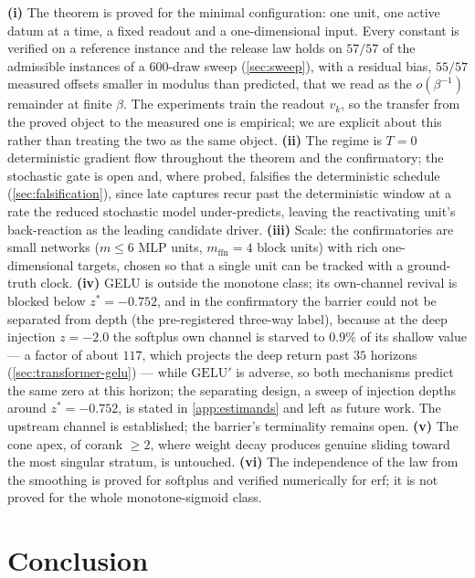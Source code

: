 \documentclass[11pt]{article}
\theoremstyle{definition}
\theoremstyle{remark}
\begin{document}
\textbf{(i)} The theorem is proved for the minimal configuration: one unit, one
active datum at a time, a fixed readout and a one-dimensional input. Every
constant is verified on a reference instance and the release law holds on
$57/57$ of the admissible instances of a 600-draw sweep (\cref{sec:sweep}), with
a residual bias, $55/57$ measured offsets smaller in modulus than predicted,
that we read as the $o(\beta^{-1})$ remainder at finite $\beta$. The experiments
train the readout $v_k$, so the transfer from the proved object to the measured
one is empirical; we are explicit about this rather than treating the two as the
same object.
\textbf{(ii)} The regime is $T=0$ deterministic gradient flow throughout the
theorem and the confirmatory; the stochastic gate is open and, where probed,
falsifies the deterministic schedule (\cref{sec:falsification}), since late
captures recur past the deterministic window at a rate the reduced stochastic
model under-predicts, leaving the reactivating unit's back-reaction as the
leading candidate driver.
\textbf{(iii)} Scale: the confirmatories are small networks ($m\le6$ MLP units,
$m_{\mathrm{ffn}}=4$ block units) with rich one-dimensional targets, chosen so
that a single unit can be tracked with a ground-truth clock.
\textbf{(iv)} GELU is outside the monotone class; its own-channel revival is
blocked below $z^\ast=-0.752$, and in the confirmatory the barrier could not be
separated from depth (the pre-registered three-way label), because at the deep
injection $z=-2.0$ the softplus own channel is starved to $0.9\%$ of its shallow
value --- a factor of about $117$, which projects the deep return past $35$
horizons (\cref{sec:transformer-gelu}) --- while $\mathrm{GELU}'$ is adverse, so
both mechanisms predict the same zero at this horizon; the separating design,
a sweep of injection depths around
$z^\ast=-0.752$, is stated in \cref{app:estimands} and left as future work. The
upstream channel is established; the barrier's terminality remains open.
\textbf{(v)} The cone apex, of corank $\ge2$, where weight decay produces genuine
sliding toward the most singular stratum, is untouched.
\textbf{(vi)} The independence of the law from the smoothing is proved for
softplus and verified numerically for erf; it is not proved for the whole
monotone-sigmoid class.

\section{Conclusion}\label{sec:conclusion}
\end{document}
